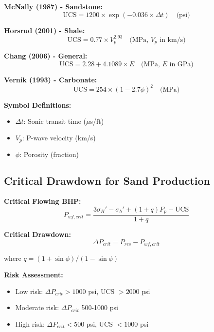 \documentclass[11pt,a4paper]{article}
\newcommand{\symitem}[2]{\item \textbf{#1}: #2}
\begin{document}
\begin{tcolorbox}[colback=formulabox,colframe=black!75]
\textbf{McNally (1987) - Sandstone:}
\begin{equation}
\text{UCS} = 1200 \times \exp(-0.036 \times \Delta t) \quad \text{(psi)}
\end{equation}

\textbf{Horsrud (2001) - Shale:}
\begin{equation}
\text{UCS} = 0.77 \times V_p^{2.93} \quad \text{(MPa, $V_p$ in km/s)}
\end{equation}

\textbf{Chang (2006) - General:}
\begin{equation}
\text{UCS} = 2.28 + 4.1089 \times E \quad \text{(MPa, $E$ in GPa)}
\end{equation}

\textbf{Vernik (1993) - Carbonate:}
\begin{equation}
\text{UCS} = 254 \times (1 - 2.7\phi)^2 \quad \text{(MPa)}
\end{equation}
\end{tcolorbox}

\textbf{Symbol Definitions:}
\begin{itemize}[leftmargin=2cm]
\symitem{$\Delta t$}{Sonic transit time ($\mu$s/ft)}
\symitem{$V_p$}{P-wave velocity (km/s)}
\symitem{$\phi$}{Porosity (fraction)}
\end{itemize}

\subsection{Critical Drawdown for Sand Production}

\begin{tcolorbox}[colback=formulabox,colframe=black!75]
\textbf{Critical Flowing BHP:}
\begin{equation}
P_{wf,crit} = \frac{3\sigma_H' - \sigma_h' + (1+q)P_p - \text{UCS}}{1+q}
\end{equation}

\textbf{Critical Drawdown:}
\begin{equation}
\Delta P_{crit} = P_{res} - P_{wf,crit}
\end{equation}

where $q = (1+\sin\phi)/(1-\sin\phi)$
\end{tcolorbox}

\textbf{Risk Assessment:}
\begin{itemize}
\item Low risk: $\Delta P_{crit} > 1000$ psi, UCS $> 2000$ psi
\item Moderate risk: $\Delta P_{crit}$ 500-1000 psi
\item High risk: $\Delta P_{crit} < 500$ psi, UCS $< 1000$ psi
\end{itemize}
\end{document}
